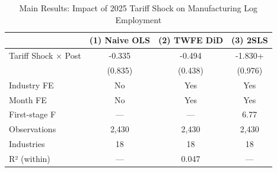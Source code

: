 \begin{table}[h]
\centering
\caption{Main Results: Impact of 2025 Tariff Shock on Manufacturing Log Employment}
\label{tab:main}
\begin{tabular}{lccc}
\toprule
 & (1) Naive OLS & (2) TWFE DiD & (3) 2SLS \\
\midrule
Tariff Shock × Post & -0.335 & -0.494 & -1.830+ \\
 & (0.835) & (0.438) & (0.976) \\
Industry FE & No & Yes & Yes \\
Month FE & No & Yes & Yes \\
First-stage F & — & — & 6.77 \\
Observations & 2,430 & 2,430 & 2,430 \\
Industries & 18 & 18 & 18 \\
R² (within) & — & 0.047 & — \\
\bottomrule
\end{tabular}
\end{table}
